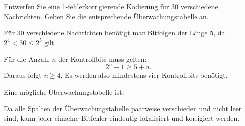 \begin{myexercise}

	Entwerfen Sie eine 1-fehlerkorrigierende Kodierung für
	30 verschiedene Nachrichten. Geben Sie die entsprechende
	Überwachungstabelle an.
	\begin{myanswer}

		Für 30 verschiedene Nachrichten benötigt man Bitfolgen der Länge 5,
		da \(2^4 < 30 \leq 2^5\) gilt.

		Für die Anzahl \(n\) der Kontrollbits muss gelten:
		\[
			2^n-1 \geq 5+n.
		\]
		Daraus folgt \(n\geq 4\). Es werden also mindestens
		vier Kontrollbits benötigt.

		Eine mögliche Überwachungstabelle ist:

		\begin{center}
		\end{center}

		Da alle Spalten der Überwachungstabelle paarweise verschieden
		und nicht leer sind, kann jeder einzelne Bitfehler eindeutig
		lokalisiert und korrigiert werden.

	\end{myanswer}
\end{myexercise}










